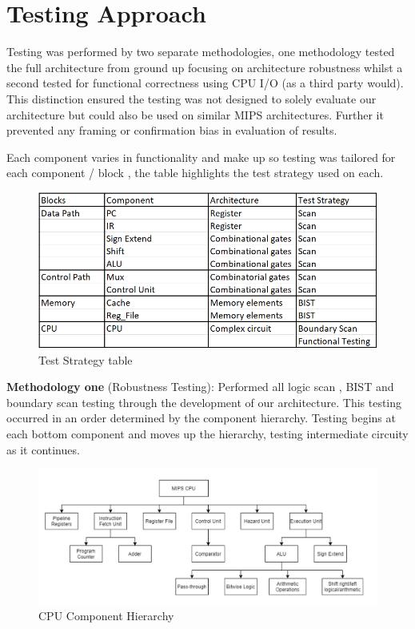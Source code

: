 \documentclass[10pt]{datasheet}
\begin{document}
\newpage

\twocolumn

\section{Testing Approach}
\smallbreak
Testing was performed by two separate methodologies, one methodology tested the full architecture from ground up focusing on architecture robustness whilst a second tested for functional correctness using CPU I/O (as a third party would). This distinction ensured the testing was not designed to solely evaluate our architecture but could also be used on similar MIPS architectures. Further it prevented any framing or confirmation bias in evaluation of results.
\smallbreak

Each component varies in functionality and make up so testing was tailored for each component / block , the table highlights the test strategy used on each.

\begin{figure}[h]
    \includegraphics[scale=0.7]{Assets/Strategy.PNG}
    \captionsetup{justification=centering}
    \caption{Test Strategy table}
\end{figure}

\smallbreak


\textbf{Methodology one} (Robustness Testing): Performed all logic scan , BIST and boundary scan testing through the development of our architecture. This testing occurred in an order determined by the component hierarchy. Testing begins at each bottom component and moves up the hierarchy, testing intermediate circuity as it continues. 
\smallbreak

\begin{figure}[h]
    \includegraphics[scale=0.45]{Assets/hierarchy2.png}
    \captionsetup{justification=centering}
    \caption{CPU Component Hierarchy}
\end{figure}
\end{document}
